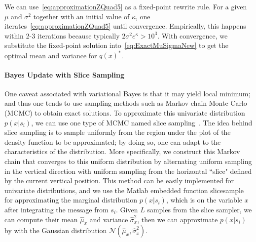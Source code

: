 We can use~\eqref{eq:approximationZQuad5}
as a fixed-point rewrite rule.
For a given $\mu$ and $\sigma^2$ together with an initial value of
$\kappa$, one iterates~\eqref{eq:approximationZQuad5} until
convergence.  Empirically, this happens within 2-3 iterations
because typically $2 \sigma^2 e^\kappa>10^3$.
With convergence, we substitute the fixed-point solution
into~\eqref{eq:ExactMuSigmaNew} to get the optimal mean
and variance for $q(x)^*$.

\paragraph{\bf Bayes Update with Slice Sampling}
One caveat associated with variational Bayes is that it may yield local minimum; and thus one tends to use sampling methods such as Markov chain Monte Carlo (MCMC) to obtain exact solutions. To approximate this univariate distribution $p(x|s_i)$, we can use one type of MCMC named slice sampling~\cite{neal03SliceSampling}. The idea behind slice sampling is to sample uniformly from the region under the plot of the density function to be approximated; by doing so, one can adapt to the characteristics of the distribution. More specifically, we construct this Markov chain that converges to this uniform distribution by alternating uniform sampling in the vertical direction with uniform sampling from the horizontal ``slice" defined by the current vertical position. This method can be easily implemented for univariate distributions, and we use the Matlab embedded function slicesample for approximating the marginal distribution $p(x|s_i)$, which is on the variable $x$ after integrating the message from $s_i$. Given $L$ samples from the slice sampler, we can compute their mean $\hat{\mu}_x$ and variance $\hat{\sigma}_x^2$, then we can approximate $p(x|s_i)$ by with the Gaussian distribution $\mathcal{N}\left(\hat{\mu}_x, \hat{\sigma}_x^2\right)$. 



